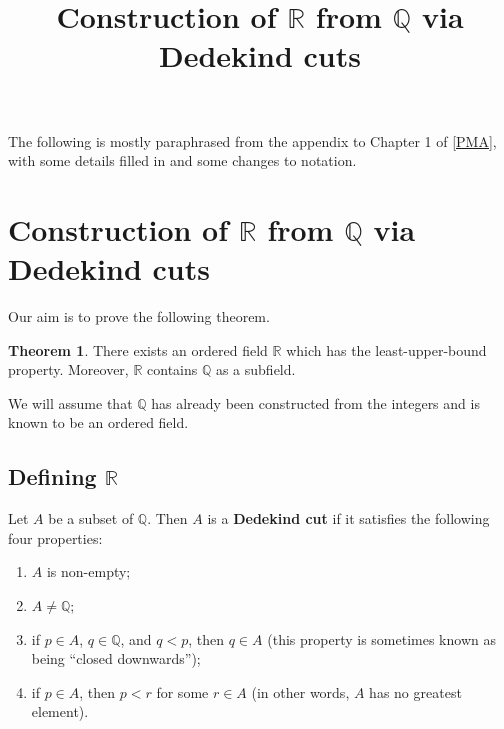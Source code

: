 \documentclass[12pt]{article}
\title{Construction of \texorpdfstring{\(\mathbb{R}\)}{} from \texorpdfstring{\(\mathbb{Q}\)}{} via Dedekind cuts}
\author{}
\date{\vspace{-24mm}}
\theoremstyle{definition}
\newtheorem{theorem}{Theorem}
\begin{document}
\maketitle

\tableofcontents

\newpage

The following is mostly paraphrased from the appendix to Chapter 1 of \hyperlink{pma}{[PMA]}, with some details filled in and some changes to notation.

\section{Construction of \texorpdfstring{\(\mathbb{R}\)}{} from \texorpdfstring{\(\mathbb{Q}\)}{} via Dedekind cuts}

Our aim is to prove the following theorem.

\begin{theorem}
\label{thm:real_number_field}
    There exists an ordered field \( \mathbb{R} \) which has the least-upper-bound property. Moreover, \( \mathbb{R} \) contains \( \mathbb{Q} \) as a subfield.
\end{theorem}

We will assume that \( \mathbb{Q} \) has already been constructed from the integers and is known to be an ordered field.

\subsection{Defining \texorpdfstring{\(\mathbb{R}\)}{}}
\label{sec:defining_R}

Let \( A \) be a subset of \( \mathbb{Q} \). Then \( A \) is a \textbf{Dedekind cut} if it satisfies the following four properties:

\begin{enumerate}[label = (\Roman*)]
    \item \( A \) is non-empty;
    
    \item \( A \neq \mathbb{Q} \);
    
    \item if \( p \in A \), \( q \in \mathbb{Q} \), and \( q < p \), then \( q \in A \) (this property is sometimes known as being ``closed downwards'');
    
    \item if \( p \in A \), then \( p < r \) for some \( r \in A \) (in other words, \( A \) has no greatest element).
\end{enumerate}
\end{document}
